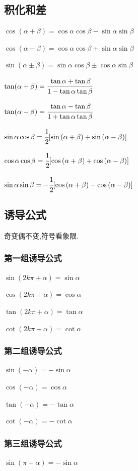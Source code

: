 \documentclass[UTF8,12pt]{ctexbook}
\begin{document}
{{\subsection{积化和差}{
  $\cos(\alpha + \beta) = \cos{\alpha}\cos{\beta} - \sin{\alpha}\sin{\beta}$

  $\cos(\alpha - \beta) = \cos{\alpha}\cos{\beta} + \sin{\alpha}\sin{\beta}$

  $\sin(\alpha \pm \beta) = \sin{\alpha}\cos{\beta} \pm \cos{\alpha}\sin{\beta}$

  $\tan(\alpha + \beta) = \cfrac{\tan\alpha + \tan\beta}{1 - \tan\alpha\tan\beta}$

  $\tan(\alpha - \beta) = \cfrac{\tan\alpha - \tan\beta}{1 + \tan\alpha\tan\beta}$

  $\sin{\alpha}\cos{\beta} = \cfrac{1}{2}[\sin{(\alpha + \beta)} + \sin{(\alpha - \beta)}]$

  $\cos{\alpha}\cos{\beta} = \cfrac{1}{2}[\cos{(\alpha + \beta)} + \cos{(\alpha - \beta)}]$

  $\sin{\alpha}\sin{\beta} = -\cfrac{1}{2}[\cos{(\alpha + \beta)} - \cos{(\alpha - \beta)}]$
}%

\subsection{诱导公式}{
  \indent 奇变偶不变,符号看象限.
  \subsubsection{第一组诱导公式}{
    $\sin{(2k\pi + \alpha)} = \sin{\alpha}$

    $\cos{(2k\pi + \alpha)} = \cos{\alpha}$

    $\tan(2k\pi + \alpha) = \tan\alpha$

    $\cot(2k\pi + \alpha) = \cot\alpha$
  }%

  \subsubsection{第二组诱导公式}{
    $\sin(-\alpha) = -\sin\alpha$

    $\cos(-\alpha) = \cos\alpha$

    $\tan(-\alpha) = -\tan\alpha$

    $\cot(-\alpha) = -\cot\alpha$
  }%

  \subsubsection{第三组诱导公式}{
    $\sin(\pi + \alpha) = -\sin\alpha$

}}}}
\end{document}

